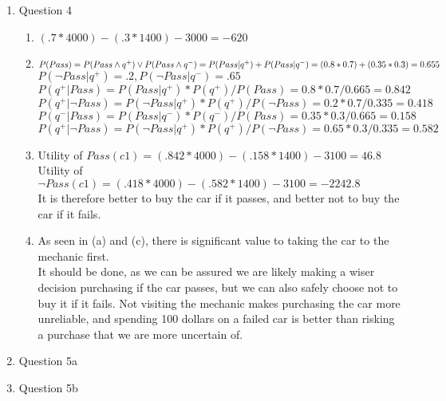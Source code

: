 \documentclass[11pt]{article}
\begin{document}
\begin{enumerate}
\item Question 4
\begin {enumerate}
\item $(.7 * 4000) - (.3 * 1400) - 3000 = -620$
\item $P(Pass) = P(Pass \land q^+) \vee P(Pass \land q^-) = P(Pass|q^+) + P(Pass|q^-) =
\\(0.8 * 0.7) + (0.35 * 0.3) = 0.655$
\\$P(\neg Pass | q^+) = .2, P(\neg Pass | q^-) = .65$
\\$P(q^+ | Pass) = P(Pass | q^+) * P(q^+) / P(Pass) = 0.8 * 0.7 / 0.665 = 0.842$
\\$P(q^+ | \neg Pass) = P(\neg Pass | q^+) * P(q^+) / P(\neg Pass) = 0.2 * 0.7 / 0.335 = 0.418$
\\$P(q^- | Pass) = P(Pass | q^-) * P(q^-) / P(Pass) = 0.35 * 0.3 / 0.665 = 0.158$
\\$P(q^+ | \neg Pass) = P(\neg Pass | q^+) * P(q^+) / P(\neg Pass) = 0.65 * 0.3 / 0.335 = 0.582$
\item Utility of $Pass(c1) = (.842 * 4000) - (.158 * 1400) - 3100 = 46.8$
\\Utility of $\neg Pass(c1) = (.418 * 4000) - (.582 * 1400) - 3100 = -2242.8$
\\It is therefore better to buy the car if it passes, and better not to buy the car if it fails.
\item As seen in (a) and (c), there is significant value to taking the car to the mechanic first.
\\It should be done, as we can be assured we are likely making a wiser decision purchasing if the car passes, but we can also safely choose not to buy it if it fails. Not visiting the mechanic makes purchasing the car more unreliable, and spending 100 dollars on a failed car is better than risking a purchase that we are more uncertain of.
\end {enumerate}

\item Question 5a

\item Question 5b


\end{enumerate}
\end{document}
